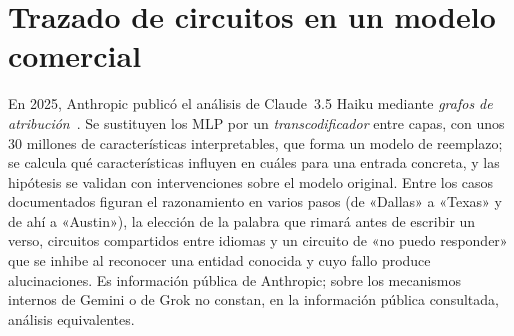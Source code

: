 \section{Trazado de circuitos en un modelo comercial}

En 2025, Anthropic publicó el análisis de Claude~3.5 Haiku mediante \emph{grafos de atribución}~\cite{lindsey}. Se sustituyen los MLP por un \emph{transcodificador} entre capas, con unos 30 millones de características interpretables, que forma un modelo de reemplazo; se calcula qué características influyen en cuáles para una entrada concreta, y las hipótesis se validan con intervenciones sobre el modelo original. Entre los casos documentados figuran el razonamiento en varios pasos (de «Dallas» a «Texas» y de ahí a «Austin»), la elección de la palabra que rimará antes de escribir un verso, circuitos compartidos entre idiomas y un circuito de «no puedo responder» que se inhibe al reconocer una entidad conocida y cuyo fallo produce alucinaciones. Es información pública de Anthropic; sobre los mecanismos internos de Gemini o de Grok no constan, en la información pública consultada, análisis equivalentes.

